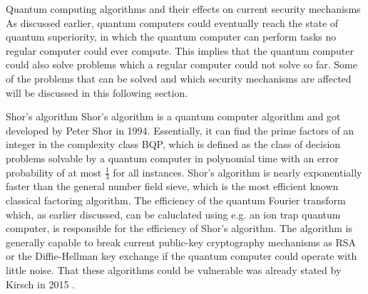 \documentclass[aps,preprintnumbers,twocolumn]{revtex4}
\begin{document}
\begin{section}{Quantum computing algorithms and their effects on current security mechanisms}
As discussed earlier, quantum computers could eventually reach the state of quantum superiority, 
in which the quantum computer can perform tasks no regular computer could ever compute.
This implies that the quantum computer could also solve problems which a regular computer could not solve so far.
Some of the problems that can be solved and which security mechanisms are affected will be discussed in this following section. 

\begin{subsection}{Shor's algorithm}
Shor's algorithm is a quantum computer algorithm and got developed by Peter Shor in 1994.
Essentially, it can find the prime factors of an integer in the complexity class BQP,
which is defined as the class of decision problems solvable by a quantum computer in polynomial time with an error probability of at most $\frac{1}{3}$ for all instances. 
Shor's algorithm is nearly exponentially faster than the general number field sieve, which is the most efficient known classical factoring algorithm.
The efficiency of the quantum Fourier transform which, as earlier discussed, can be caluclated using e.g. an ion trap quantum computer, is responsible for the efficiency of Shor's algorithm.
The algorithm is generally capable to break current public-key cryptography mechanisms as RSA or the Diffie-Hellman key exchange if the quantum computer could operate with little noise. 
That these algorithms could be vulnerable was already stated by Kirsch in 2015
\cite{Kirsch2015QuantumCT}.


\end{subsection}
\end{section}
\end{document}
